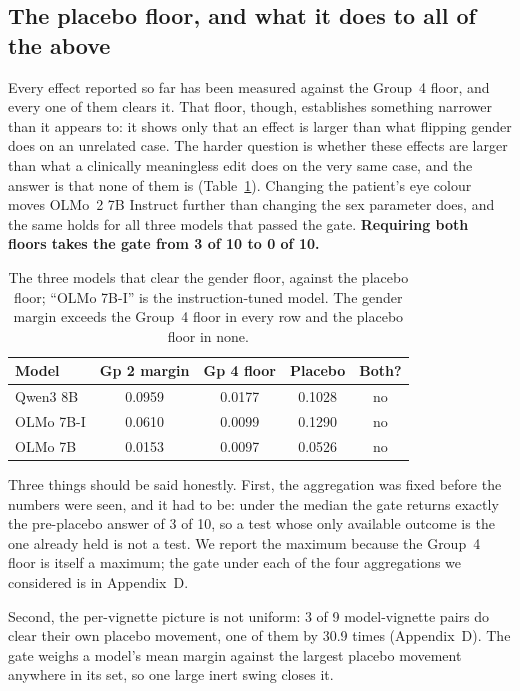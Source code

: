 \documentclass[11pt,twocolumn]{article}
\begin{document}
\subsection{The placebo floor, and what it does to all of the above}
\label{sec:placebo}

Every effect reported so far has been measured against the Group~4 floor, and
every one of them clears it. That floor, though, establishes something narrower
than it appears to: it shows only that an effect is larger than what flipping
gender does on an unrelated case. The harder question is whether these effects
are larger than what a clinically meaningless edit does on the very same case,
and the answer is that none of them is (Table~\ref{tab:placebo}). Changing the patient's eye colour
moves OLMo~2 7B Instruct further than changing the sex parameter does, and the
same holds for all three models that passed the gate. \textbf{Requiring both
floors takes the gate from 3 of 10 to 0 of 10.}

\begin{table}[!t]
\centering\footnotesize
\setlength{\tabcolsep}{3pt}
\caption{The three models that clear the gender floor, against the placebo floor; ``OLMo 7B-I'' is the instruction-tuned model. The gender margin exceeds the Group~4 floor in every row and the placebo floor in none.}
\label{tab:placebo}
\begin{tabular}{@{}lcccc@{}}
\toprule
\textbf{Model} & \textbf{Gp 2 margin} & \textbf{Gp 4 floor} & \textbf{Placebo} & \textbf{Both?} \\
\midrule
\rowcolor{rose} Qwen3 8B & 0.0959 & 0.0177 & 0.1028 & no \\
OLMo 7B-I & 0.0610 & 0.0099 & 0.1290 & no \\
\rowcolor{rose} OLMo 7B & 0.0153 & 0.0097 & 0.0526 & no \\
\bottomrule
\end{tabular}
\end{table}

Three things should be said honestly. First, the aggregation was fixed before the
numbers were seen, and it had to be: under the median the gate returns exactly
the pre-placebo answer of 3 of 10, so a test whose only available outcome is the
one already held is not a test. We report the maximum because the Group~4 floor
is itself a maximum; the gate under each of the four aggregations we considered
is in Appendix~D.

Second, the per-vignette picture is not uniform: 3 of 9 model-vignette pairs do
clear their own placebo movement, one of them by 30.9 times (Appendix~D). The
gate weighs a model's mean margin against the largest placebo movement anywhere
in its set, so one large inert swing closes it.
\end{document}

